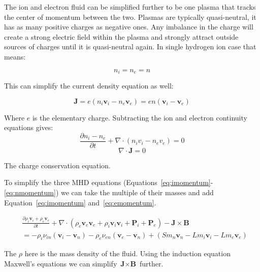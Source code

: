 \documentclass[12pt,upcase]{umlthesis}
\begin{document}
The ion and electron fluid can be simplified further to be one plasma that tracks the center of momentum between the two. Plasmas are typically quasi-neutral, it has as many positive charges as negative ones. Any imbalance in the charge will create a strong electric field within the plasma and strongly attract outside sources of charges until it is quasi-neutral again. In single hydrogen ion case that means:


\begin{equation}\label{eq:quasineutrality}
	n_i = n_e = n
\end{equation}

This can simplify the current density equation as well:

\begin{equation}\label{eq:currentdensity}
	\textbf{J} = e ( n_i \textbf{v}_i - n_e \textbf{v}_e) = e n (\textbf{v}_i - \textbf{v}_e)
\end{equation}

Where $e$ is the elementary charge. Subtracting the ion and electron continuity equations gives:
\begin{equation}
	\frac{\partial n_i - n_e}{\partial t} + \nabla\cdot(n_i v_i - n_e v_e) = 0
\end{equation}
\begin{equation}\label{eq:chargeconservation}
	\nabla\cdot\textbf{J} = 0
\end{equation}

The charge conservation equation.

To simplify the three MHD equations (Equations~\ref{eq:imomentum}-\ref{eq:nmomentum}) we can take the multiple of their masses and add Equation~\ref{eq:imomentum} and~\ref{eq:emomentum}.

\begin{equation}\label{eq:singlemomentum}
	\begin{aligned}
		& \frac{\partial \rho_i \textbf{v}_i + \rho_e \textbf{v}_e}{\partial t} + \nabla \cdot (\rho_e \textbf{v}_e \textbf{v}_e + \rho_i \textbf{v}_i \textbf{v}_i + \textbf{P}_i + \textbf{P}_e) - \textbf{J} \times \textbf{B} \\
		& = - \rho_i \nu_{in}(\textbf{v}_i - \textbf{v}_n) - \rho_e \nu_{en} (\textbf{v}_e - \textbf{v}_n)+ (S m_n \textbf{v}_n - L m_i \textbf{v}_i - L m_e \textbf{v}_e)
\end{aligned}
\end{equation}

The $\rho$ here is the mass density of the fluid. Using the induction equation Maxwell's equations we can simplify $\textbf{J} \times \textbf{B}$ further.
\end{document}
